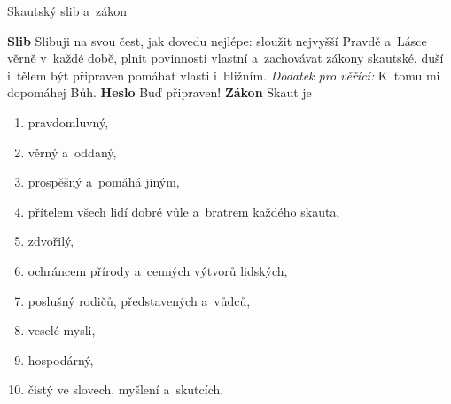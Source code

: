 \documentclass[compress, ucs, xelatex, xcolor=dvipsnames, print,
  hyperref={
    bookmarks=true,
    unicode=true,
    colorlinks=true,
    plainpages=false,
    pdfkeywords={Junak, Pedagogika, Skaut, Skauting, Vychovna metoda},
    linkcolor=Black,
    anchorcolor=Black,
    citecolor=OliveGreen,
    filecolor=OliveGreen,
    menucolor=Black,
    urlcolor=OliveGreen,
    pdftex}
  ]{beamer}
\begin{document}
\begin{frame}{Skautský slib a~zákon}
  \begin{multicols}{3}
    \vfill
    \textbf{Slib}
    \vfill
    Slibuji na svou čest, jak dovedu nejlépe: sloužit nejvyšší Pravdě a~Lásce věrně v~každé době, plnit povinnosti vlastní a~zachovávat zákony skautské, duší i~tělem být připraven pomáhat vlasti i~bližním.
    \vfill
    \textit{Dodatek pro věřící:} K~tomu mi dopomáhej Bůh.
    \vfill
    \textbf{Heslo}
    \vfill
    Buď připraven!
    \vfill
    \textbf{Zákon}
    \vfill
    Skaut je
    \begin{enumerate}
      \item pravdomluvný,
      \item věrný a~oddaný,
      \item prospěšný a~pomáhá jiným,
      \item přítelem všech lidí dobré vůle a~bratrem každého skauta,
      \item zdvořilý,
      \item ochráncem přírody a~cenných výtvorů lidských,
      \item poslušný rodičů, představených a~vůdců,
      \item veselé mysli,
      \item hospodárný,
      \item čistý ve slovech, myšlení a~skutcích.
    \end{enumerate}
  \end{multicols}
\end{frame}
\end{document}
